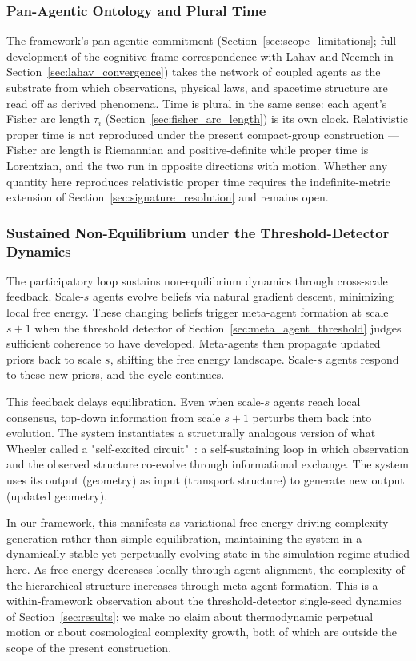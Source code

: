 \documentclass[11pt]{article}
\begin{document}
\subsubsection{Pan-Agentic Ontology and Plural Time}

The framework's pan-agentic commitment (Section~\ref{sec:scope_limitations}; full development of the cognitive-frame correspondence with Lahav and Neemeh in Section~\ref{sec:lahav_convergence}) takes the network of coupled agents as the substrate from which observations, physical laws, and spacetime structure are read off as derived phenomena. Time is plural in the same sense: each agent's Fisher arc length $\tau_i$ (Section~\ref{sec:fisher_arc_length}) is its own clock. Relativistic proper time is not reproduced under the present compact-group construction --- Fisher arc length is Riemannian and positive-definite while proper time is Lorentzian, and the two run in opposite directions with motion. Whether any quantity here reproduces relativistic proper time requires the indefinite-metric extension of Section~\ref{sec:signature_resolution} and remains open.

\subsubsection{Sustained Non-Equilibrium under the Threshold-Detector Dynamics}

The participatory loop sustains non-equilibrium dynamics through cross-scale feedback. Scale-$s$ agents evolve beliefs via natural gradient descent, minimizing local free energy. These changing beliefs trigger meta-agent formation at scale $s+1$ when the threshold detector of Section~\ref{sec:meta_agent_threshold} judges sufficient coherence to have developed. Meta-agents then propagate updated priors back to scale $s$, shifting the free energy landscape. Scale-$s$ agents respond to these new priors, and the cycle continues.

This feedback delays equilibration. Even when scale-$s$ agents reach local consensus, top-down information from scale $s+1$ perturbs them back into evolution. The system instantiates a structurally analogous version of what Wheeler called a "self-excited circuit"~\cite{Wheeler1983}: a self-sustaining loop in which observation and the observed structure co-evolve through informational exchange. The system uses its output (geometry) as input (transport structure) to generate new output (updated geometry).

In our framework, this manifests as variational free energy driving complexity generation rather than simple equilibration, maintaining the system in a dynamically stable yet perpetually evolving state in the simulation regime studied here. As free energy decreases locally through agent alignment, the complexity of the hierarchical structure increases through meta-agent formation. This is a within-framework observation about the threshold-detector single-seed dynamics of Section~\ref{sec:results}; we make no claim about thermodynamic perpetual motion or about cosmological complexity growth, both of which are outside the scope of the present construction.
\end{document}
